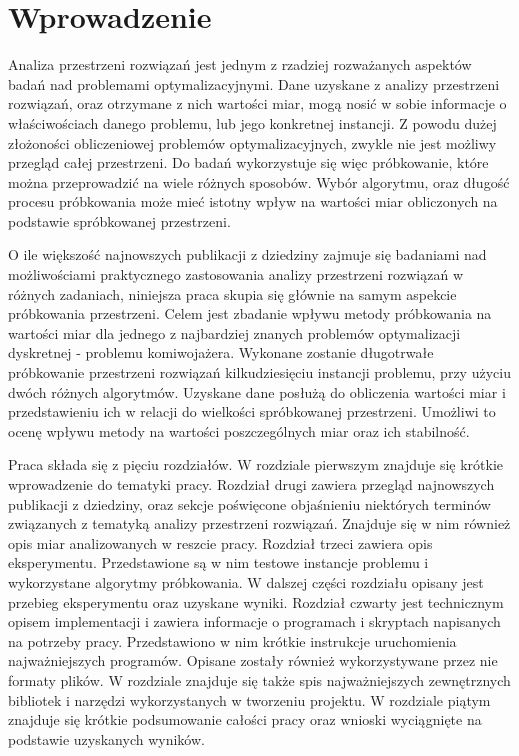 \chapter{Wprowadzenie}

Analiza przestrzeni rozwiązań jest jednym z rzadziej rozważanych aspektów badań nad problemami optymalizacyjnymi.
Dane uzyskane z analizy przestrzeni rozwiązań, oraz otrzymane z nich wartości miar, mogą nosić w sobie
informacje o właściwościach danego problemu, lub jego konkretnej instancji.
Z powodu dużej złożoności obliczeniowej problemów optymalizacyjnych, zwykle nie jest możliwy przegląd całej przestrzeni.
Do badań wykorzystuje się więc próbkowanie, które można przeprowadzić na wiele różnych sposobów.
Wybór algorytmu, oraz długość procesu próbkowania może mieć istotny wpływ na wartości miar obliczonych na podstawie spróbkowanej przestrzeni.

O ile większość najnowszych publikacji z dziedziny zajmuje się badaniami nad możliwościami praktycznego zastosowania analizy przestrzeni rozwiązań w różnych zadaniach,
niniejsza praca skupia się głównie na samym aspekcie próbkowania przestrzeni.
Celem jest zbadanie wpływu metody próbkowania na wartości miar dla jednego z najbardziej znanych
problemów optymalizacji dyskretnej - problemu komiwojażera.
Wykonane zostanie długotrwałe próbkowanie przestrzeni rozwiązań kilkudziesięciu instancji problemu, przy użyciu dwóch różnych algorytmów.
Uzyskane dane posłużą do obliczenia wartości miar i przedstawieniu ich w relacji do wielkości spróbkowanej przestrzeni.
Umożliwi to ocenę wpływu metody na wartości poszczególnych miar oraz ich stabilność.

Praca składa się z pięciu rozdziałów.
W rozdziale pierwszym znajduje się krótkie wprowadzenie do tematyki pracy.
Rozdział drugi zawiera przegląd najnowszych publikacji z dziedziny, oraz sekcje poświęcone objaśnieniu niektórych terminów związanych z tematyką
analizy przestrzeni rozwiązań. Znajduje się w nim również opis miar analizowanych w reszcie pracy.
Rozdział trzeci zawiera opis eksperymentu. Przedstawione są w nim testowe instancje problemu i wykorzystane algorytmy próbkowania.
W dalszej części rozdziału opisany jest przebieg eksperymentu oraz uzyskane wyniki.
Rozdział czwarty jest technicznym opisem implementacji i zawiera informacje o programach i skryptach napisanych na potrzeby pracy.
Przedstawiono w nim krótkie instrukcje uruchomienia najważniejszych programów. Opisane zostały również wykorzystywane przez nie formaty plików.
W rozdziale znajduje się także spis najważniejszych zewnętrznych bibliotek i narzędzi wykorzystanych w tworzeniu projektu.
W rozdziale piątym znajduje się krótkie podsumowanie całości pracy oraz wnioski wyciągnięte na podstawie uzyskanych wyników.
